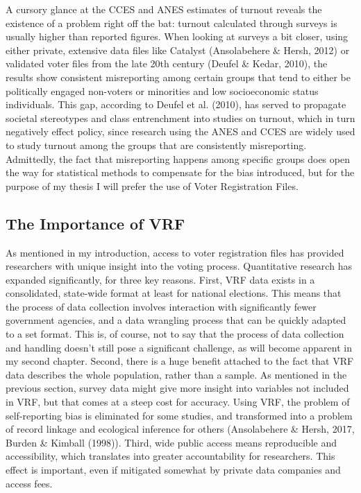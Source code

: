 \documentclass[12pt,twoside]{reedthesis}
\begin{document}
  A cursory glance at the CCES and ANES estimates of turnout reveals the
  existence of a problem right off the bat: turnout calculated through
  surveys is usually higher than reported figures. When looking at surveys
  a bit closer, using either private, extensive data files like Catalyst
  (Ansolabehere \& Hersh, 2012) or validated voter files from the late
  20th century (Deufel \& Kedar, 2010), the results show consistent
  misreporting among certain groups that tend to either be politically
  engaged non-voters or minorities and low socioeconomic status
  individuals. This gap, according to Deufel et al. (2010), has served to
  propagate societal stereotypes and class entrenchment into studies on
  turnout, which in turn negatively effect policy, since research using
  the ANES and CCES are widely used to study turnout among the groups that
  are consistently misreporting. Admittedly, the fact that misreporting
  happens among specific groups does open the way for statistical methods
  to compensate for the bias introduced, but for the purpose of my thesis
  I will prefer the use of Voter Registration Files.
  
  \subsection{The Importance of VRF}\label{the-importance-of-vrf}
  
  As mentioned in my introduction, access to voter registration files has
  provided researchers with unique insight into the voting process.
  Quantitative research has expanded significantly, for three key reasons.
  First, VRF data exists in a consolidated, state-wide format at least for
  national elections. This means that the process of data collection
  involves interaction with significantly fewer government agencies, and a
  data wrangling process that can be quickly adapted to a set format. This
  is, of course, not to say that the process of data collection and
  handling doesn't still pose a significant challenge, as will become
  apparent in my second chapter. Second, there is a huge benefit attached
  to the fact that VRF data describes the whole population, rather than a
  sample. As mentioned in the previous section, survey data might give
  more insight into variables not included in VRF, but that comes at a
  steep cost for accuracy. Using VRF, the problem of self-reporting bias
  is eliminated for some studies, and transformed into a problem of record
  linkage and ecological inference for others (Ansolabehere \& Hersh,
  2017, Burden \& Kimball (1998)). Third, wide public access means
  reproducible and accessibility, which translates into greater
  accountability for researchers. This effect is important, even if
  mitigated somewhat by private data companies and access fees.
  
\end{document}
